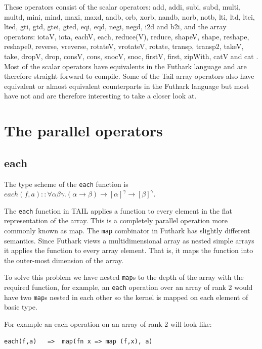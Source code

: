 \documentclass[11pt]{article}
\begin{document}
These operators consist of the scalar operators: add, addi, subi, subd, multi, multd, mini, mind, maxi, maxd, andb, orb, xorb, nandb, norb, notb, lti, ltd, ltei, lted, gti, gtd, gtei, gted, eqi, eqd, negi, negd, i2d and b2i, and the array operators: iotaV, iota, eachV, each, reduce(V), reduce, shapeV, shape, reshape, reshape0, reverse, vreverse, rotateV, vrotateV, rotate, transp, transp2, takeV, take, dropV, drop, consV, cons, snocV, snoc, firstV, first, zipWith, catV and cat \cite{ElsmanDybdal:Array:2014}. \\

Most of the scalar operators have equivalents in the Futhark language and are therefore straight forward to compile.
Some of the Tail array operators also have equivalent or almost equivalent counterparts in the Futhark language
but most have not and are therefore interesting to take a closer look at.


\section{The parallel operators}

\subsection{each}

The type scheme of the {\tt each} function is $each(f,a) :: \forall\alpha\beta\gamma.(\alpha \to \beta) \to [\alpha]^\gamma \to [\beta]^\gamma$.

The {\tt each} function in TAIL applies a function to every element in the flat representation of the array.
This is a completely parallel operation more commonly known as map.
The {\tt map} combinator in Futhark has slightly different semantics\cite{ElsmanDybdal:Array:2014}.
Since Futhark views a multidimensional array as nested simple arrays it applies the function to every array element.
That is, it maps the function into the outer-most dimension of the array\cite{TroelsHenriksen}.

To solve this problem we have nested {\tt map}s to the depth of the array with the required function,
for example, an {\tt each} operation over an array of rank 2 would have two {\tt map}s nested in each other so the kernel is
mapped on each element of basic type.

For example an each operation on an array of rank 2 will look like:
\begin{lstlisting}[numbers=none,frame=none]
each(f,a)	=>	map(fn x => map (f,x), a)
\end{lstlisting}
\end{document}
